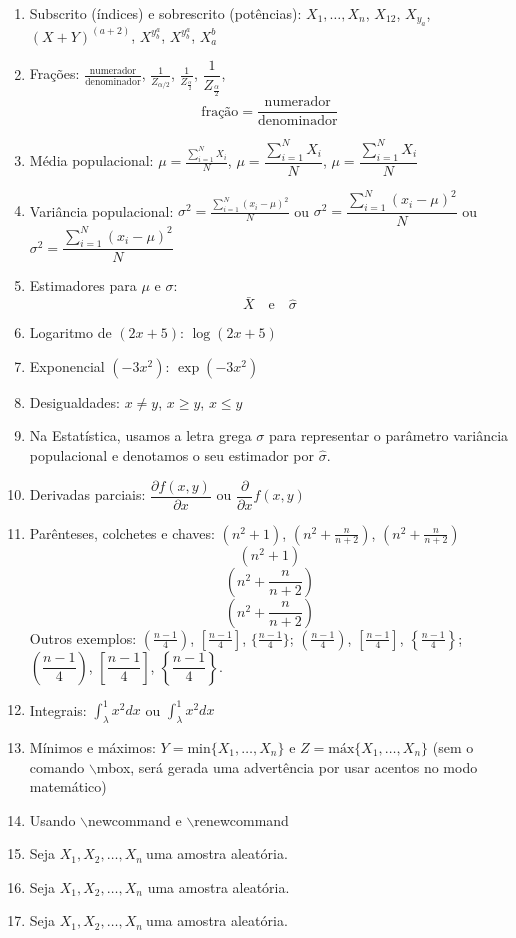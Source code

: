\documentclass[12pt]{article}
\newcommand{\amostra}{$X_1,X_2,\ldots,X_n\ $}
\renewcommand{\aa}{amostra aleatória}
\begin{document}
\begin{enumerate}
    \item Subscrito (índices) e sobrescrito (potências): $X_1, \ldots, X_n$, $X_{12}$, $X_{y_a}$, $(X+Y)^{(a+2)}$, $X^{y^a_b}$, $X^{y_b^a}$, $X_a^b$
    \item Frações: $\frac{\mbox{numerador}}{\mbox{denominador}}$, 
    $\frac{1}{ Z_{\alpha/2} }$,
    $\frac{1}{ Z_{\frac{\alpha}{2}} }$,
    $\dfrac{1}{ Z_{\frac{\alpha}{2}} }$,
    $$\mbox{fração} = \frac{\mbox{numerador}}{\mbox{denominador}}$$
   	\item Média populacional: 
	$\mu = \frac{\sum_{i=1}^N X_i}{N}$, $\mu = \dfrac{\sum_{i=1}^N X_i}{N}$, $\mu = \dfrac{\displaystyle\sum_{i=1}^N X_i}{N}$
	\item Variância populacional: $ \sigma^2 =  \frac{\sum_{i=1}^{N} (x_i-\mu)^2}{N} $ ou $ \sigma^2 =  \dfrac{\sum_{i=1}^{N} (x_i-\mu)^2}{N} $ ou $ \sigma^2 =  \dfrac{\displaystyle\sum_{i=1}^{N} (x_i-\mu)^2}{N}$
	\item Estimadores para $\mu$ e $\sigma$: $$\bar{X} \quad \mbox{e} \quad \hat{\sigma}$$
	\item Logaritmo de $(2x+5)$: $\log(2x+5)$
	\item Exponencial $(-3x^2)$: $\exp(-3x^2)$
    \item Desigualdades: $x\neq y$, $ x\ge y$, $x \le y$
    \item Na Estatística, usamos a letra grega $\sigma$ para representar o parâmetro variância populacional e denotamos o seu estimador por $\hat{\sigma}$.
    \item Derivadas parciais: $\dfrac{\partial{ f(x,y)}}{\partial{x}}$ ou $\dfrac{\partial{}}{\partial{x}}f(x,y)$
    \item Parênteses, colchetes e chaves:  $(n^2 +1)$, $(n^2 + \frac{n}{n+2})$, $\left(n^2 + \frac{n}{n+2}\right)$
    $$(n^2 +1)$$
    $$(n^2 + \frac{n}{n+2})$$
    $$\left(n^2 + \frac{n}{n+2}\right)$$
    Outros exemplos: 
    $( \frac{n-1}{4})$, $[\frac{n-1}{4}]$, $\{ \frac{n-1}{4}\}$;  
    $\left( \frac{n-1}{4} \right)$,  $\left[ \frac{n-1}{4} \right]$, $\left\{ \frac{n-1}{4} \right\}$;
    $\left( \dfrac{n-1}{4} \right)$, $\left[ \dfrac{n-1}{4} \right]$,  $\left\{ \dfrac{n-1}{4} \right\}$.
    \item Integrais: $\int_{\lambda}^{1} x^2 dx$ ou  $\displaystyle\int_{\lambda}^{1} x^2 dx$
    \item Mínimos e máximos: $Y=\mbox{min}\{X_1,\ldots,X_n\}$ e $Z=\mbox{máx}\{X_1,\ldots,X_n\}$ (sem o comando $\backslash$mbox, será gerada uma advertência por usar acentos no modo matemático)
    \item Usando $\backslash$newcommand e $\backslash$renewcommand
    \item[] Seja \amostra uma amostra aleatória.
    \item[] Seja $X_1,X_2,\ldots,X_n$ uma amostra aleatória.
    \item[] Seja \amostra uma \aa.
\end{enumerate}  
\end{document}
